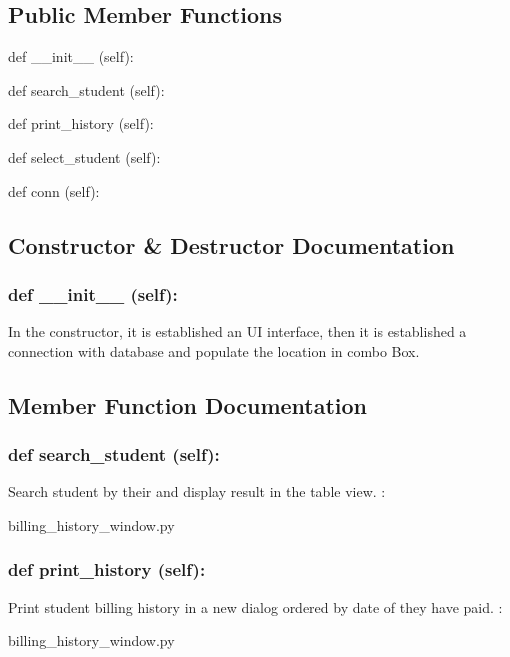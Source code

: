 \subsection*{Public Member Functions}
\begin{DoxyCompactItemize}
\item 
def {\_\_init\_\_} (self):
\item 
def {search\_student} (self):
\item 
def {print\_history} (self):
\item 
def {select\_student} (self):
\item 
def {conn} (self):
\end{DoxyCompactItemize}

\subsection{Constructor \& Destructor Documentation}
\hypertarget{class_poly_aa3def076b74bed67904976ad4f9fe9b1}{
\subsubsection[{def __init__ (self):}]{\setlength{\rightskip}{0pt plus 5cm}def {\_\_init\_\_} (self): 
}}
In the constructor, it is established an UI interface, then it is  established a connection with database and populate the location in combo Box.
 

\subsection{Member Function Documentation}
\hypertarget{class_poly_a14a7ad77ce612b0c54f531d307ee4b39}{
\subsubsection[{def search_student (self):}]{\setlength{\rightskip}{0pt plus 5cm}def {search\_student} (self):}}\label{class_poly_a14a7ad77ce612b0c54f531d307ee4b39}
Search student by their and display result in the table view.
:\begin{DoxyCompactItemize}
\item 
billing\_history\_window.\-py\end{DoxyCompactItemize}

\hypertarget{class_poly_a14a7ad77ce612b0c54f531d307ee4b39}{
\subsubsection[{def print_history (self):}]{\setlength{\rightskip}{0pt plus 5cm}def {print\_history} (self):}}\label{class_poly_a14a7ad77ce612b0c54f531d307ee4b39}
Print student billing history in a new dialog ordered by date of they have paid.
:\begin{DoxyCompactItemize} 
\item 
billing\_history\_window.\-py\end{DoxyCompactItemize}

